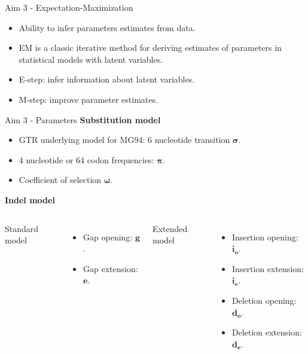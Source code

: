 \documentclass{beamer}
\begin{document}
\begin{frame}{Aim 3 - Expectation-Maximization} %
\begin{itemize}
	\setlength\itemsep{1em}
	\item Ability to infer parameters estimates from data.
	\item EM \parencite{dempster_laird_rubin_EM_1977} is a classic iterative
		method for deriving estimates of parameters in statistical models with
		latent variables.
	\item E-step: infer information about latent variables.
	\item M-step: improve parameter estimates.
\end{itemize}
\end{frame} %

\begin{frame}{Aim 3 - Parameters} %
\textbf{Substitution model}
\begin{itemize}
	\item GTR\parencite{tavare_gtr_1986} underlying model for MG94:
		6 nucleotide transition $\bm{\sigma}$.
	\item 4 nucleotide or 64 codon frequencies: $\bm{\pi}$.
	\item Coefficient of selection $\bm{\omega}$.
\end{itemize}

\vspace{2em}
\textbf{Indel model}
\begin{columns}[T]
Standard model
\begin{itemize}
	\item Gap opening: $\bm{g}$.
	\item Gap extension: $\bm{e}$.
\end{itemize}
Extended model
\begin{itemize}
	\item Insertion opening: $\bm{i_o}$.
	\item Insertion extension: $\bm{i_e}$.
	\item Deletion opening: $\bm{d_o}$.
	\item Deletion extension: $\bm{d_e}$.
\end{itemize}
\end{columns}
\end{frame} %
\end{document}
